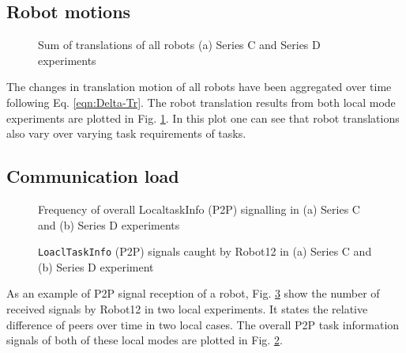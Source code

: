\subsection*{Robot motions}
\begin{figure}
\centering
\hspace*{0.5cm}
\newline
\centering
{}
\caption{\small Sum of translations of all robots (a) Series C and Series D experiments }
\label{fig:translation-SC-SD} 
\end{figure}
The changes in translation motion of all robots have been aggregated over time following Eq. \ref{eqn:Delta-Tr}. The robot translation results from both local mode experiments are plotted in Fig. \ref{fig:translation-SC-SD}. In this plot one can see that robot translations also vary over varying task requirements of tasks. 
\subsection*{Communication load}
\begin{figure}
\centering
\hspace*{0.5cm}
\newline
\centering
{}
\caption{\small Frequency of overall LocaltaskInfo (P2P) signalling in (a) Series C and (b) Series D experiments}
\label{fig:local-signal-frequency-stat} %
\end{figure}
%
\begin{figure}
\centering
\hspace*{0.5cm}
\newline
{}
\caption{\small \texttt{LoaclTaskInfo} (P2P) signals caught by Robot12 in (a) Series C and (b) Series D experiment}
\label{fig:local-single-robot-signal} 
\end{figure}
As an example of P2P signal reception of a robot,  Fig. \ref{fig:local-single-robot-signal} show the number of received signals by Robot12 in two local experiments. It states the relative difference of peers over time in two local cases. The overall P2P task information signals of both of these local modes are plotted in Fig. \ref{fig:local-signal-frequency-stat}. 
